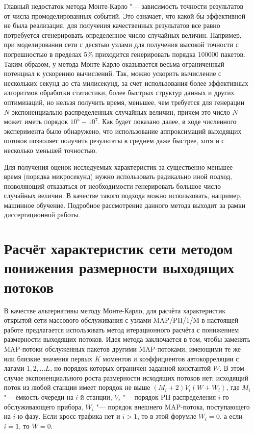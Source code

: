 Главный недостаток метода Монте-Карло "--- зависимость точности результатов от числа промоделированных событий. Это означает, что какой бы эффективной не была реализация, для получения качественных результатов все равно потребуется сгенерировать определенное число случайных величин. Например, при моделировании сети с десятью узлами для получения высокой точности с погрешностью в пределах 5\% приходится генерировать порядка 100000 пакетов. Таким образом, у метода Монте-Карло оказывается весьма ограниченный потенциал к ускорению вычислений. Так, можно ускорить вычисление с нескольких секунд до ста милисекунд, за счет использования более эффективных алгоритмов обработки статистики, более быстрых структур данных и других оптимизаций, но нельзя получить время, меньшее, чем требуется для генерации $N$ экспоненциально-распределенных случайных величин, причем это число $N$ может иметь порядок $10^5-10^7$. Как будет показано далее, в ходе численного эксперимента было обнаружено, что использование аппроксимаций выходящих потоков позволяет получить результаты в среднем даже быстрее, хотя и с несколько меньшей точностью.

Для получения оценок исследуемых характеристик за существенно меньшее время (порядка микросекунд) нужно использовать радикально иной подход, позволяющий отказаться от необходимости генерировать большое число случайных величин. В качестве такого подхода можно использовать, например, машинное обучение. Подробное рассмотрение данного метода выходит за рамки диссертационной работы.


\section{Расчёт характеристик сети методом понижения размерности выходящих потоков}

В качестве альтернативы методу Монте-Карло, для расчёта характеристик открытой сети массового обслуживания с узлами MAP/PH/1/M в настоящей работе предлагается использовать метод итерационного расчёта с понижением размерности выходящих потоков. Идея метода заключается в том, чтобы заменять MAP-потоки обслуженных пакетов другими MAP-потоками, имеющими те же или близкие значения первых $K$ моментов и коэффициентов автокорреляции с лагами $1, 2, \dots L$, но порядок которых ограничен заданной константой $W$. В этом случае экспоненциального роста размерности исходящих потоков нет: исходящий поток из любой станции имеет порядок не выше $(M_i + 2) V_i (W + W_i)$, где $M_i$ "--- ёмкость очереди на $i$-й станции, $V_i$ "--- порядок PH-распределения $i$-го обслуживающего прибора, $W_i$ "--- порядок внешнего MAP-потока, поступающего на $i$-ю фазу. Если кросс-трафика нет и $i > 1$, то в этой форумле $W_i = 0$, а если $i = 1$, то $W = 0$.

